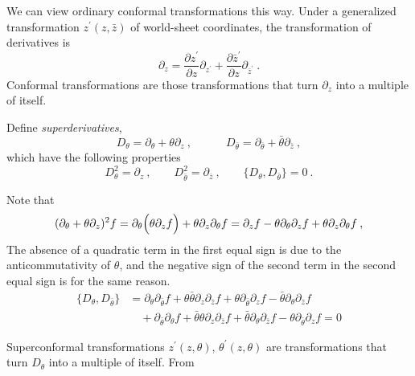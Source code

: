 We can view ordinary conformal transformations this way. Under a generalized transformation $z^{\prime}(z,\bar{z})$ of world-sheet coordinates, the transformation of derivatives is
\begin{equation}
	\partial_{z} = \frac{\partial z^{\prime}}{\partial z} \partial_{z^{\prime}}
	+\frac{\partial \bar{z}^{\prime}}{\partial z} \partial_{\bar{z}^{\prime}} \:.\label{12.3.2}
\end{equation}
Conformal transformations are those transformations that turn $\partial_{z}$ into a multiple of itself.

Define \textit{superderivatives},
\begin{equation}
	D_{\theta} = \partial_{\theta} + \theta \partial_{z}\:, \qquad \quad 
	D_{\bar{\theta}} = \partial_{\bar{\theta}}+ \bar{\theta}\partial_{\bar{z}} \:, \label{12.3.3}
\end{equation}
which have the following properties
\begin{equation}
	D_{\theta}^{2} = \partial_{z}\:, \qquad D_{\bar{\theta}}^{2} = \partial_{\bar{z}}\:,\qquad
	\{D_{\theta},D_{\bar{\theta}}\} = 0 \:. \label{12.3.4}
\end{equation}
\begin{tcolorbox}[breakable]
	Note that
	\begin{align*}
		(\partial_{\theta}+\theta\partial_{z})^{2}f =\partial_{\theta}\Bigl(\theta \partial_{z}f\Bigr)
		+\theta \partial_{z}\partial_{\theta} f = \partial_{z}f - \theta \partial_{\theta}\partial_{z}f
		+\theta \partial_{z}\partial_{\theta} f \:,
	\end{align*}
	The absence of a quadratic term in the first equal sign is due to the anticommutativity of $\theta$, and the negative sign of the second term in the second equal sign is for the same reason.
	\begin{align*}
		\{D_{\theta},D_{\bar{\theta}}\} &=\partial_{\theta}\partial_{\bar{\theta}}f+ \theta\bar{\theta}\partial_{z}\partial_{\bar{z}}f+\theta\partial_{\bar{\theta}}\partial_{z}f
		-\bar{\theta}\partial_{\theta}\partial_{\bar{z}}f \\
		&\quad +\partial_{\bar{\theta}}\partial_{\theta}f+ \bar{\theta}\theta\partial_{z}\partial_{\bar{z}}f
		+\bar{\theta}\partial_{\theta}\partial_{\bar{z}}f -\theta\partial_{\bar{\theta}}\partial_{z}f =0
	\end{align*}
\end{tcolorbox}
\noindent Superconformal transformations $z^{\prime}(z,\theta)$, $\theta^{\prime}(z,\theta)$ are transformations that turn $D_{\theta}$ into a multiple of itself. From
